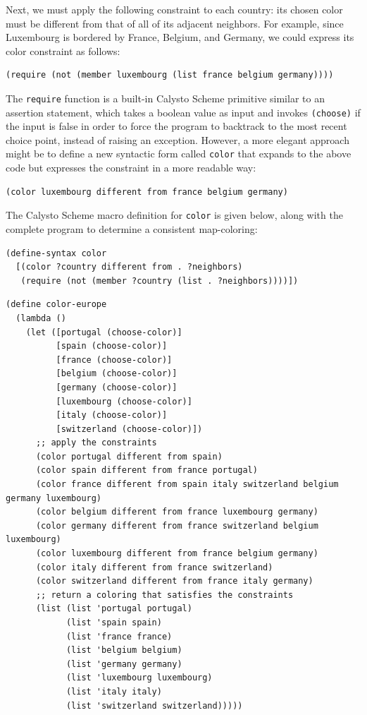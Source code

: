 \documentclass[acmsmall,screen,nonacm]{acmart}
\begin{document}
\noindent
Next, we must apply the following constraint to each country: its chosen color
must be different from that of all of its adjacent neighbors.  For example,
since Luxembourg is bordered by France, Belgium, and Germany, we could express
its color constraint as follows:

{\small
\begin{verbatim}
(require (not (member luxembourg (list france belgium germany))))
\end{verbatim}
}

\noindent
The \texttt{require} function is a built-in Calysto Scheme primitive similar to
an assertion statement, which takes a boolean value as input and invokes
\texttt{(choose)} if the input is false in order to force the program to
backtrack to the most recent choice point, instead of raising an exception.
However, a more elegant approach might be to define a new syntactic form called
\texttt{color} that expands to the above code but expresses the constraint in a
more readable way:

{\small
\begin{verbatim}
(color luxembourg different from france belgium germany)
\end{verbatim}
}

\noindent
The Calysto Scheme macro definition for \texttt{color} is given below, along
with the complete program to determine a consistent map-coloring:

{\small
\begin{verbatim}
(define-syntax color
  [(color ?country different from . ?neighbors)
   (require (not (member ?country (list . ?neighbors))))])
\end{verbatim}
}

\noindent
\begin{minipage}{\textwidth}
{\small
\begin{verbatim}
(define color-europe
  (lambda ()
    (let ([portugal (choose-color)]
          [spain (choose-color)]
          [france (choose-color)]
          [belgium (choose-color)]
          [germany (choose-color)]
          [luxembourg (choose-color)]
          [italy (choose-color)]
          [switzerland (choose-color)])
      ;; apply the constraints
      (color portugal different from spain)
      (color spain different from france portugal)
      (color france different from spain italy switzerland belgium germany luxembourg)
      (color belgium different from france luxembourg germany)
      (color germany different from france switzerland belgium luxembourg)
      (color luxembourg different from france belgium germany)
      (color italy different from france switzerland)
      (color switzerland different from france italy germany)
      ;; return a coloring that satisfies the constraints
      (list (list 'portugal portugal)
            (list 'spain spain)
            (list 'france france)
            (list 'belgium belgium)
            (list 'germany germany)
            (list 'luxembourg luxembourg)
            (list 'italy italy)
            (list 'switzerland switzerland)))))

\end{verbatim}
}
\end{minipage}
\end{document}
